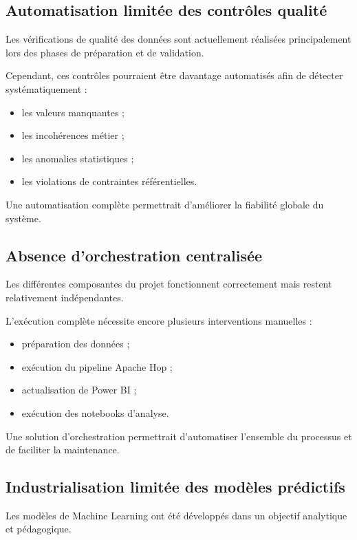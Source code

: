 \documentclass[12pt,a4paper,twoside]{report}
\begin{document}
\subsection{Automatisation limitée des contrôles qualité}

Les vérifications de qualité des données sont actuellement réalisées principalement lors des phases de préparation et de validation.

Cependant, ces contrôles pourraient être davantage automatisés afin de détecter systématiquement :

\begin{itemize}
    \item les valeurs manquantes ;
    \item les incohérences métier ;
    \item les anomalies statistiques ;
    \item les violations de contraintes référentielles.
\end{itemize}

Une automatisation complète permettrait d'améliorer la fiabilité globale du système.

\subsection{Absence d'orchestration centralisée}

Les différentes composantes du projet fonctionnent correctement mais restent relativement indépendantes.

L'exécution complète nécessite encore plusieurs interventions manuelles :

\begin{itemize}
    \item préparation des données ;
    \item exécution du pipeline Apache Hop ;
    \item actualisation de Power BI ;
    \item exécution des notebooks d'analyse.
\end{itemize}

Une solution d'orchestration permettrait d'automatiser l'ensemble du processus et de faciliter la maintenance.

\subsection{Industrialisation limitée des modèles prédictifs}

Les modèles de Machine Learning ont été développés dans un objectif analytique et pédagogique.
\end{document}
